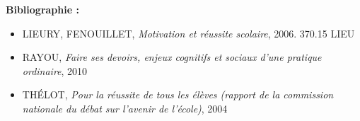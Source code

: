 \documentclass[12pt]{article}
\begin{document}
\textbf{Bibliographie : }
\begin{itemize}
\item LIEURY, FENOUILLET,\textit{ Motivation et réussite scolaire}, 2006. 370.15 LIEU \\
\item RAYOU, \textit{Faire ses devoirs, enjeux cognitifs et sociaux d'une pratique ordinaire}, 2010 \\
\item THÉLOT, \textit{Pour la réussite de tous les élèves (rapport de la commission nationale du débat sur l'avenir de l'école)}, 2004
\end{itemize}
\end{document}
